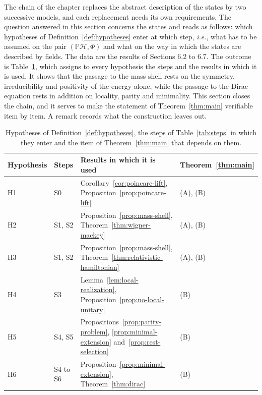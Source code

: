 The chain of the chapter replaces the abstract description of the states by two successive models, and each replacement needs its own requirements. The question answered in this section concerns the states and reads as follows: which hypotheses of Definition~\ref{def:hypotheses} enter at which step, \textit{i.e.}, what has to be assumed on the pair $(\mathbb{P}\mathcal{H},\Phi)$ and what on the way in which the states are described by fields. The data are the results of Sections 6.2 to 6.7. The outcome is Table~\ref{tab:hypotheses-steps}, which assigns to every hypothesis the steps and the results in which it is used. It shows that the passage to the mass shell rests on the symmetry, irreducibility and positivity of the energy alone, while the passage to the Dirac equation rests in addition on locality, parity and minimality. This section closes the chain, and it serves to make the statement of Theorem~\ref{thm:main} verifiable item by item. A remark records what the construction leaves out.

\begin{table}[ht]
	\centering
	\small
	\renewcommand{\arraystretch}{1.25}
	\begin{tabular}{llp{6.4cm}l}
		\hline
		\textbf{Hypothesis} & \textbf{Steps} & \textbf{Results in which it is used} & \textbf{Theorem~\ref{thm:main}} \\
		\hline
		H1 & S0 & Corollary~\ref{cor:poincare-lift}, Proposition~\ref{prop:poincare-lift} & (A), (B) \\
		H2 & S1, S2 & Proposition~\ref{prop:mass-shell}, Theorem~\ref{thm:wigner-mackey} & (A), (B) \\
		H3 & S1, S2 & Proposition~\ref{prop:mass-shell}, Theorem~\ref{thm:relativistic-hamiltonian} & (A), (B) \\
		H4 & S3 & Lemma~\ref{lem:local-realization}, Proposition~\ref{prop:no-local-unitary} & (B) \\
		H5 & S4, S5 & Propositions~\ref{prop:parity-problem}, \ref{prop:minimal-extension} and~\ref{prop:rest-selection} & (B) \\
		H6 & S4 to S6 & Proposition~\ref{prop:minimal-extension}, Theorem~\ref{thm:dirac} & (B) \\
		\hline
	\end{tabular}
	\caption{Hypotheses of Definition~\ref{def:hypotheses}, the steps of Table~\ref{tab:steps} in which they enter and the item of Theorem~\ref{thm:main} that depends on them.}
	\label{tab:hypotheses-steps}
\end{table}

